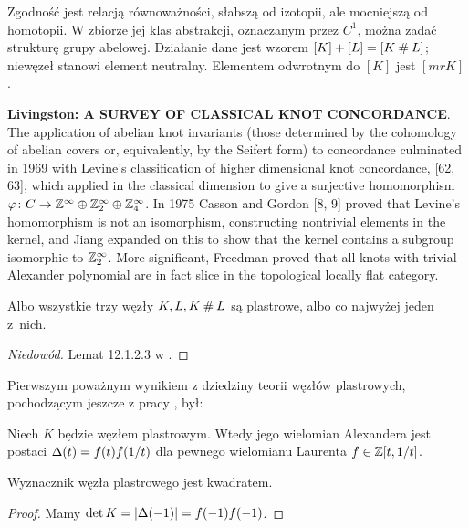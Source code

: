 Zgodność jest relacją równoważności, słabszą od izotopii, ale mocniejszą od homotopii.
W zbiorze jej klas abstrakcji, oznaczanym przez $C^1$, można zadać strukturę grupy abelowej.
Działanie dane jest wzorem $[K] + [L] = [K \mathbin{\#} L]$; niewęzeł stanowi element neutralny.
Elementem odwrotnym do $[K]$ jest $[mrK]$.

\textbf{Livingston: A SURVEY OF CLASSICAL KNOT CONCORDANCE}.
The application of abelian knot invariants (those determined by the cohomology of abelian covers or, equivalently, by the Seifert form) to concordance culminated in 1969 with Levine’s classification of higher dimensional knot concordance, [62, 63], which applied in the classical dimension to give a surjective homomorphism $\varphi \colon C \to \mathbb Z^\infty \oplus \mathbb Z_2^\infty \oplus \mathbb Z_4^\infty$.
In 1975 Casson and Gordon [8, 9] proved that Levine’s homomorphism is not an isomorphism, constructing nontrivial elements in the kernel, and Jiang expanded on this to show that the kernel contains a subgroup isomorphic to $\mathbb Z_2^\infty$.
More significant, Freedman proved that all knots with trivial Alexander polynomial are in fact slice in the topological locally flat category.

\begin{proposition}
    Albo wszystkie trzy węzły $K, L, K \mathbin{\#} L$ są plastrowe, albo co najwyżej jeden z~nich.
\end{proposition}

\begin{proof}[Niedowód]
    Lemat 12.1.2.3 w \cite{kawauchi96}.
\end{proof}

Pierwszym poważnym wynikiem z dziedziny teorii węzłów plastrowych, pochodzącym jeszcze z pracy \cite{fox66}, był:

\begin{proposition}
    Niech $K$ będzie węzłem plastrowym.
    Wtedy jego wielomian Alexandera jest postaci $\Delta(t) = f(t) f(1/t)$ dla pewnego wielomianu Laurenta $f \in \mathbb Z[t, 1/t]$.
\end{proposition}

\begin{corollary} \label{slice_square_det}
    Wyznacznik węzła plastrowego jest kwadratem.
\end{corollary}

\begin{proof}
    Mamy $\det K = |\Delta(-1)| = f(-1) f(-1)$.
\end{proof}

